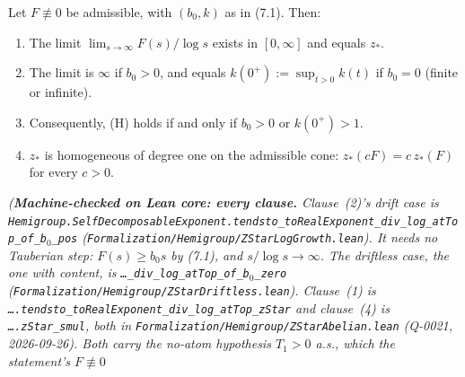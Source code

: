 \begin{lemma}\label{lem:zstar-log-growth}
\leanok
Let $F \not\equiv 0$ be admissible, with $(b_0, k)$ as in (7.1). Then:
\begin{enumerate}
\item The limit $\lim_{s\to\infty} F(s)/\log s$ exists in $[0,\infty]$ and equals $z_*$.
\item The limit is $\infty$ if $b_0 > 0$, and equals $k(0^+) := \sup_{t>0} k(t)$ if $b_0 = 0$
(finite or infinite).
\item Consequently, (H) holds if and only if $b_0 > 0$ or $k(0^+) > 1$.
\item $z_*$ is homogeneous of degree one on the admissible cone: $z_*(cF) = c\,z_*(F)$ for every
$c > 0$.
\end{enumerate}
\statusT\quad\emph{(\textbf{Machine-checked on Lean core: every clause.}
Clause~(2)'s \emph{drift} case is
\texttt{Hemigroup.SelfDecomposableExponent.tendsto\_toRealExponent\_div\_log\_atTop\_of\_b}$_0$\texttt{\_pos}
(\texttt{Formalization/Hemigroup/ZStarLogGrowth.lean}). It needs no Tauberian step: $F(s) \ge b_0 s$
by (7.1), and $s/\log s \to \infty$. The \emph{driftless} case, the one with content, is
\texttt{\ldots\_div\_log\_atTop\_of\_b}$_0$\texttt{\_zero}
(\texttt{Formalization/Hemigroup/ZStarDriftless.lean}). Clause~(1) is
\texttt{\ldots.tendsto\_toRealExponent\_div\_log\_atTop\_zStar} and clause~(4) is
\texttt{\ldots.zStar\_smul}, both in \texttt{Formalization/Hemigroup/ZStarAbelian.lean} (Q-0021,
2026-09-26). Both carry the no-atom hypothesis $T_1 > 0$ a.s., which the statement's $F \not\equiv 0$
}
\end{lemma}
